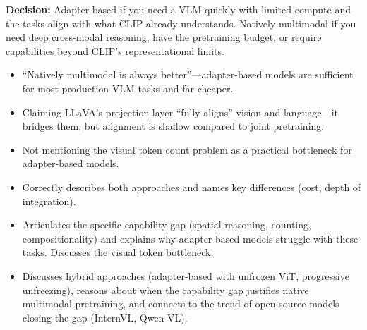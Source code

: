 \begin{interviewq}
\textbf{Decision:} Adapter-based if you need a VLM quickly with limited compute and the tasks align with what CLIP already understands. Natively multimodal if you need deep cross-modal reasoning, have the pretraining budget, or require capabilities beyond CLIP's representational limits.

\redflags
\begin{itemize}
    \item ``Natively multimodal is always better''---adapter-based models are sufficient for most production VLM tasks and far cheaper.
    \item Claiming LLaVA's projection layer ``fully aligns'' vision and language---it bridges them, but alignment is shallow compared to joint pretraining.
    \item Not mentioning the visual token count problem as a practical bottleneck for adapter-based models.
\end{itemize}


\goodgreat
\begin{itemize}
    \item {} Correctly describes both approaches and names key differences (cost, depth of integration).
    \item {} Articulates the specific capability gap (spatial reasoning, counting, compositionality) and explains why adapter-based models struggle with these tasks. Discusses the visual token bottleneck.
    \item {} Discusses hybrid approaches (adapter-based with unfrozen ViT, progressive unfreezing), reasons about when the capability gap justifies native multimodal pretraining, and connects to the trend of open-source models closing the gap (InternVL, Qwen-VL).
\end{itemize}

\end{interviewq}


